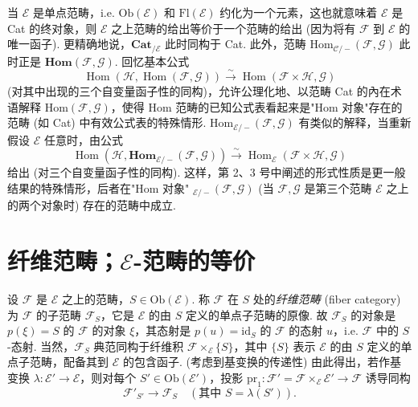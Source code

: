 \begin{remarkstar}
当 $\mathcal{E}$ 是单点范畴，i.e. $\mathrm{Ob}(\mathcal{E})$ 和 $\mathrm{Fl}(\mathcal{E})$ 约化为一个元素，这也就意味着 $\mathcal{E}$ 是 Cat 的终对象，则 $\mathcal{E}$ 之上范畴的给出等价于一个范畴的给出 (因为将有 $\mathcal{F}$ 到 $\mathcal{E}$ 的唯一函子). 更精确地说，$\mathbf{Cat}_{/\mathcal{E}}$ 此时同构于 Cat. 此外，范畴 Hom$_{\mathcal{C}/-}(\mathcal{F}, \mathcal{G})$ 此时正是 $\mathbf{Hom}(\mathcal{F}, \mathcal{G})$. 回忆基本公式
\[
\operatorname{Hom}(\mathcal{H}, \operatorname{Hom}(\mathcal{F}, \mathcal{G})) \stackrel{\sim}{\longrightarrow} \operatorname{Hom}(\mathcal{F} \times \mathcal{H}, \mathcal{G})
\]
(对其中出现的三个自变量函子性的同构)，允许公理化地、以范畴 Cat 的內在术语解释 Hom$(\mathcal{F}, \mathcal{G})$，使得 Hom 范畴的已知公式表看起来是"Hom 对象"存在的范畴 (如 Cat) 中有效公式表的特殊情形. Hom$_{\mathcal{E}/-}(\mathcal{F}, \mathcal{G})$ 有类似的解释，当重新假设 $\mathcal{E}$ 任意时，由公式
\[
\operatorname{Hom}(\mathcal{H}, \mathbf{Hom}_{\mathcal{E}/-}(\mathcal{F}, \mathcal{G})) \stackrel{\sim}{\longrightarrow} \operatorname{Hom}_{\mathcal{E}}(\mathcal{F} \times \mathcal{H}, \mathcal{G})
\]
给出 (对三个自变量函子性的同构). 这样，第 2、3 号中阐述的形式性质是更一般结果的特殊情形，后者在"Hom 对象" $_{\mathcal{E}/-}(\mathcal{F}, \mathcal{G})$ (当 $\mathcal{F}, \mathcal{G}$ 是第三个范畴 $\mathcal{E}$ 之上的两个对象时) 存在的范畴中成立.
\end{remarkstar}

\section{纤维范畴；\texorpdfstring{$\mathcal{E}$}{E}-范畴的等价}

设 $\mathcal{F}$ 是 $\mathcal{E}$ 之上的范畴，$S \in \mathrm{Ob}(\mathcal{E})$. 称 $\mathcal{F}$ 在 $S$ 处的\emph{纤维范畴} (fiber category) 为 $\mathcal{F}$ 的子范畴 $\mathcal{F}_S$，它是 $\mathcal{E}$ 的由 $S$ 定义的单点子范畴的原像. 故 $\mathcal{F}_S$ 的对象是 $p(\xi) = S$ 的 $\mathcal{F}$ 的对象 $\xi$，其态射是 $p(u) = \mathrm{id}_S$ 的 $\mathcal{F}$ 的态射 $u$，i.e. $\mathcal{F}$ 中的 $S$-态射. 当然，$\mathcal{F}_S$ 典范同构于纤维积 $\mathcal{F} \times_{\mathcal{E}} \{S\}$，其中 $\{S\}$ 表示 $\mathcal{E}$ 的由 $S$ 定义的单点子范畴，配备其到 $\mathcal{E}$ 的包含函子. (考虑到基变换的传递性) 由此得出，若作基变换 $\lambda \colon \mathcal{E}' \to \mathcal{E}$，则对每个 $S' \in \mathrm{Ob}(\mathcal{E}')$，投影 $\mathrm{pr}_1 \colon \mathcal{F}' = \mathcal{F} \times_{\mathcal{E}} \mathcal{E}' \to \mathcal{F}$ 诱导同构
\[
\mathcal{F}'_{S'} \longrightarrow \mathcal{F}_S \quad (\text{其中 } S = \lambda(S')).
\]

